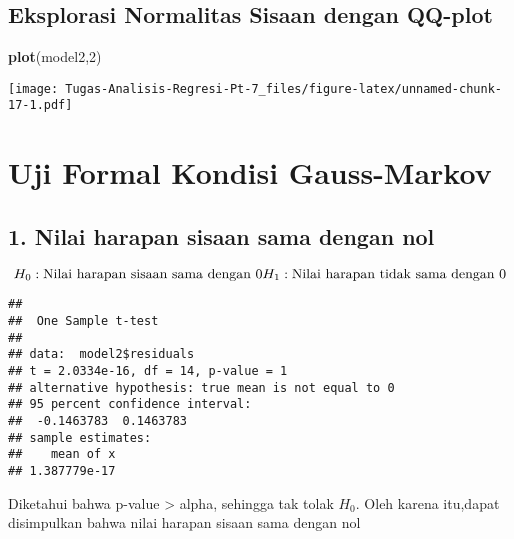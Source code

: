 \documentclass[
]{article}
\newenvironment{Shaded}{\begin{snugshade}}{\end{snugshade}}
\newcommand{\AttributeTok}[1]{\textcolor[rgb]{0.13,0.29,0.53}{#1}}
\newcommand{\DecValTok}[1]{\textcolor[rgb]{0.00,0.00,0.81}{#1}}
\newcommand{\FloatTok}[1]{\textcolor[rgb]{0.00,0.00,0.81}{#1}}
\newcommand{\FunctionTok}[1]{\textcolor[rgb]{0.13,0.29,0.53}{\textbf{#1}}}
\newcommand{\NormalTok}[1]{#1}
\newcommand{\SpecialCharTok}[1]{\textcolor[rgb]{0.81,0.36,0.00}{\textbf{#1}}}
\begin{document}
\hypertarget{eksplorasi-normalitas-sisaan-dengan-qq-plot-1}{%
\subsection{Eksplorasi Normalitas Sisaan dengan
QQ-plot}\label{eksplorasi-normalitas-sisaan-dengan-qq-plot-1}}

\begin{Shaded}
\begin{Highlighting}[]
\FunctionTok{plot}\NormalTok{(model2,}\DecValTok{2}\NormalTok{)}
\end{Highlighting}
\end{Shaded}

\texttt{[image: Tugas-Analisis-Regresi-Pt-7\_files/figure-latex/unnamed-chunk-17-1.pdf]}

\hypertarget{uji-formal-kondisi-gauss-markov-1}{%
\section{Uji Formal Kondisi
Gauss-Markov}\label{uji-formal-kondisi-gauss-markov-1}}

\hypertarget{nilai-harapan-sisaan-sama-dengan-nol-1}{%
\subsection{1. Nilai harapan sisaan sama dengan
nol}\label{nilai-harapan-sisaan-sama-dengan-nol-1}}

\[
H_0 : \text{Nilai harapan sisaan sama dengan 0}\\H_1 : \text{Nilai harapan tidak sama dengan 0}
\]

\begin{Shaded}
\end{Shaded}

\begin{verbatim}
## 
##  One Sample t-test
## 
## data:  model2$residuals
## t = 2.0334e-16, df = 14, p-value = 1
## alternative hypothesis: true mean is not equal to 0
## 95 percent confidence interval:
##  -0.1463783  0.1463783
## sample estimates:
##    mean of x 
## 1.387779e-17
\end{verbatim}

Diketahui bahwa p-value \textgreater{} alpha, sehingga tak tolak
\(H_0\). Oleh karena itu,dapat disimpulkan bahwa nilai harapan sisaan
sama dengan nol
\end{document}
